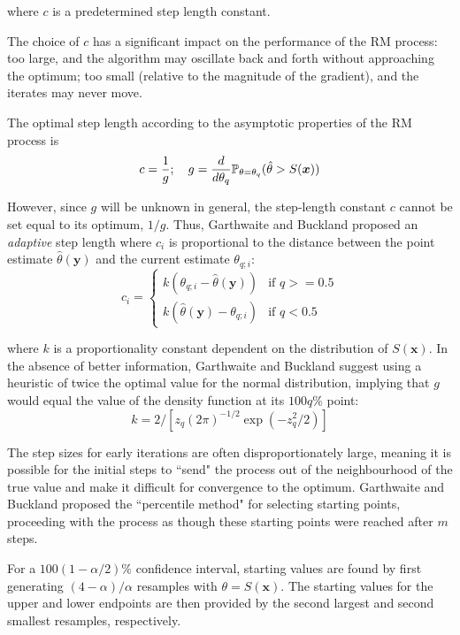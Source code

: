 where $c$ is a predetermined step length constant.

The choice of $c$ has a significant impact on the performance of the RM process: too large, and the algorithm may oscillate back and forth without approaching the optimum; too small (relative to the magnitude of the gradient), and the iterates may never move. 

The optimal step length according to the asymptotic properties of the RM process is \begin{equation}
    c = \frac{1}{g};\quad g = \frac{d}{d\theta_q} \mathbb{P}_{\theta = \theta_q} (\hat\theta > S(\bm{x}))
\end{equation}

However, since $g$ will be unknown in general, the step-length constant $c$ cannot be set equal to its optimum, $1/g$. Thus, Garthwaite and Buckland proposed an \textit{adaptive} step length where $c_i$ is proportional to the distance between the point estimate $\hat\theta(\bm{y})$ and the current estimate $\theta_{q; i}$:\begin{equation} c_i = \begin{cases}
    k\left(\theta_{q; i} - \hat\theta(\bm{y}) \right) &\text{if $q >= 0.5$} \\
    k\left(\hat\theta(\bm{y}) - \theta_{q; i}\right) &\text{if $q < 0.5$}
\end{cases}
\end{equation}

where $k$ is a proportionality constant dependent on the distribution of $S(\bm{x})$. In the absence of better information, Garthwaite and Buckland suggest using a heuristic of twice the optimal value for the normal distribution, implying that $g$ would equal the value of the density function at its $100q$\% point: \[
k = 2/\left[z_q (2\pi)^{-1/2}\exp(-z_q^2/2)\right]
\]

The step sizes for early iterations are often disproportionately large, meaning it is possible for the initial steps to ``send" the process out of the neighbourhood of the true value and make it difficult for convergence to the optimum. Garthwaite and Buckland proposed the ``percentile method" for selecting starting points, proceeding with the process as though these starting points were reached after $m$ steps.

For a $100(1-\alpha/2)\%$ confidence interval, starting values are found by first generating $(4-\alpha)/\alpha$ resamples with $\theta = S(\bm{x})$. The starting values for the upper and lower endpoints are then provided by the second largest and second smallest resamples, respectively.

